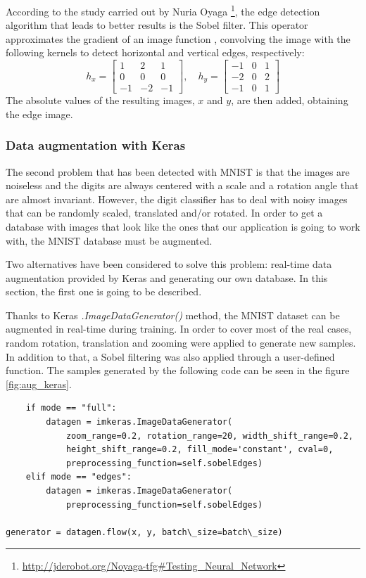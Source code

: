 According to the study carried out by Nuria Oyaga \footnote{\url{http://jderobot.org/Noyaga-tfg\#Testing\_Neural\_Network}}, the edge detection algorithm that leads to better results is the Sobel filter. This operator approximates the gradient of an image function \cite{sonka2014image}, convolving the image with the following kernels to detect horizontal and vertical edges, respectively:  
\begin{equation}
h_x = 
\begin{bmatrix}
1 & 2 & 1\\
0 & 0 & 0\\
-1 & -2 & -1
\end{bmatrix}
,\quad
h_y = 
\begin{bmatrix}
-1 & 0 & 1\\
-2 & 0 & 2\\
-1 & 0 & 1
\end{bmatrix}
\end{equation}
The absolute values of the resulting images, $x$ and $y$, are then added, obtaining the edge image.

\subsubsection{Data augmentation with Keras}
The second problem that has been detected with MNIST is that the images are noiseless and the digits are always centered with a scale and a rotation angle that are almost invariant. However, the digit classifier has to deal with noisy images that can be randomly scaled, translated and/or rotated. In order to get a database with images that look like the ones that our application is going to work with, the MNIST database must be augmented.

Two alternatives have been considered to solve this problem: real-time data augmentation provided by Keras and generating our own database. In this section, the first one is going to be described.

Thanks to Keras \textit{.ImageDataGenerator()} method, the MNIST dataset can be augmented in real-time during training. In order to cover most of the real cases, random rotation, translation and zooming were applied to generate new samples. In addition to that, a Sobel filtering was also applied through a user-defined function. The samples generated by the following code can be seen in the figure \ref{fig:aug_keras}.

\begin{lstlisting}
	if mode == "full":
		datagen = imkeras.ImageDataGenerator(
			zoom_range=0.2, rotation_range=20, width_shift_range=0.2, 
			height_shift_range=0.2, fill_mode='constant', cval=0,
			preprocessing_function=self.sobelEdges)
	elif mode == "edges":
		datagen = imkeras.ImageDataGenerator(
			preprocessing_function=self.sobelEdges)

generator = datagen.flow(x, y, batch\_size=batch\_size)
\end{lstlisting}

